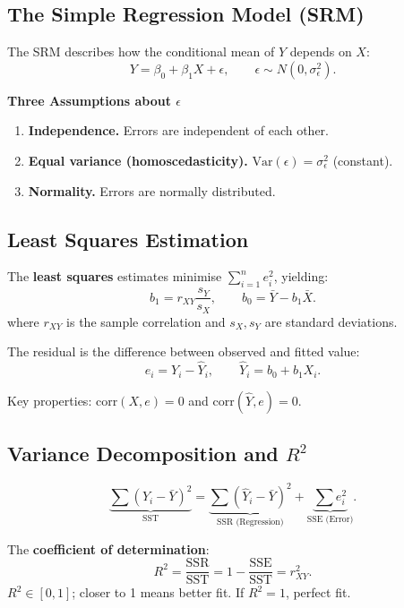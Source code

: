 \documentclass[12pt, a4paper]{article}
\begin{document}
\subsection{The Simple Regression Model (SRM)}

The SRM describes how the conditional mean of $Y$ depends on $X$:
\[
  Y = \beta_0 + \beta_1 X + \epsilon, \qquad \epsilon \sim N(0,\sigma_\epsilon^2).
\]

\begin{keybox}
\noindent\textbf{Three Assumptions about $\epsilon$}\par\smallskip
\begin{enumerate}
  \item \textbf{Independence.} Errors are independent of each other.
  \item \textbf{Equal variance (homoscedasticity).} $\text{Var}(\epsilon) = \sigma_\epsilon^2$ (constant).
  \item \textbf{Normality.} Errors are normally distributed.
\end{enumerate}
\end{keybox}

\subsection{Least Squares Estimation}

The \textbf{least squares} estimates minimise $\sum_{i=1}^n e_i^2$, yielding:
\[
  b_1 = r_{XY}\frac{s_Y}{s_X}, \qquad b_0 = \bar{Y} - b_1\bar{X}.
\]
where $r_{XY}$ is the sample correlation and $s_X, s_Y$ are standard deviations.

The residual is the difference between observed and fitted value:
\[
  e_i = Y_i - \hat{Y}_i, \qquad \hat{Y}_i = b_0 + b_1 X_i.
\]

Key properties: $\text{corr}(X, e) = 0$ and $\text{corr}(\hat{Y}, e) = 0$.

\subsection{Variance Decomposition and $R^2$}

\[
  \underbrace{\sum(Y_i-\bar{Y})^2}_{\text{SST}} =
  \underbrace{\sum(\hat{Y}_i-\bar{Y})^2}_{\text{SSR (Regression)}} +
  \underbrace{\sum e_i^2}_{\text{SSE (Error)}}.
\]

The \textbf{coefficient of determination}:
\[
  R^2 = \frac{\text{SSR}}{\text{SST}} = 1 - \frac{\text{SSE}}{\text{SST}} = r_{XY}^2.
\]
$R^2 \in [0,1]$; closer to 1 means better fit. If $R^2 = 1$, perfect fit.
\end{document}
